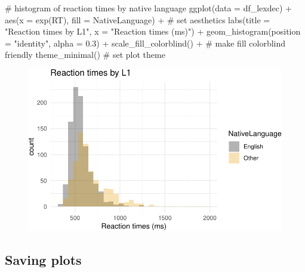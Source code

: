 \documentclass[
  letterpaper,
  DIV=11]{scrartcl}
\newenvironment{Shaded}{\begin{snugshade}}{\end{snugshade}}
\newcommand{\AttributeTok}[1]{\textcolor[rgb]{0.40,0.45,0.13}{#1}}
\newcommand{\CommentTok}[1]{\textcolor[rgb]{0.37,0.37,0.37}{#1}}
\newcommand{\FloatTok}[1]{\textcolor[rgb]{0.68,0.00,0.00}{#1}}
\newcommand{\FunctionTok}[1]{\textcolor[rgb]{0.28,0.35,0.67}{#1}}
\newcommand{\NormalTok}[1]{\textcolor[rgb]{0.00,0.23,0.31}{#1}}
\newcommand{\SpecialCharTok}[1]{\textcolor[rgb]{0.37,0.37,0.37}{#1}}
\newcommand{\StringTok}[1]{\textcolor[rgb]{0.13,0.47,0.30}{#1}}
\theoremstyle{definition}
\theoremstyle{remark}
\begin{document}
\begin{Shaded}
\begin{Highlighting}[]
\CommentTok{\# histogram of reaction times by native language}
\FunctionTok{ggplot}\NormalTok{(}\AttributeTok{data =}\NormalTok{ df\_lexdec) }\SpecialCharTok{+}
  \FunctionTok{aes}\NormalTok{(}\AttributeTok{x =} \FunctionTok{exp}\NormalTok{(RT), }\AttributeTok{fill =}\NormalTok{ NativeLanguage) }\SpecialCharTok{+} \CommentTok{\# set aesthetics}
  \FunctionTok{labs}\NormalTok{(}\AttributeTok{title =} \StringTok{"Reaction times by L1"}\NormalTok{,}
     \AttributeTok{x =} \StringTok{"Reaction times (ms)"}\NormalTok{) }\SpecialCharTok{+}
  \FunctionTok{geom\_histogram}\NormalTok{(}\AttributeTok{position =} \StringTok{"identity"}\NormalTok{, }\AttributeTok{alpha =} \FloatTok{0.3}\NormalTok{) }\SpecialCharTok{+}
  \FunctionTok{scale\_fill\_colorblind}\NormalTok{() }\SpecialCharTok{+} \CommentTok{\# make fill colorblind friendly}
  \FunctionTok{theme\_minimal}\NormalTok{() }\CommentTok{\# set plot theme}
\end{Highlighting}
\end{Shaded}

\begin{figure}[centre]

{\centering \includegraphics{_intro_r_slides_files/figure-pdf/unnamed-chunk-24-1.pdf}

}

\end{figure}

\hypertarget{saving-plots}{%
\subsection{Saving plots}\label{saving-plots}}
\end{document}
